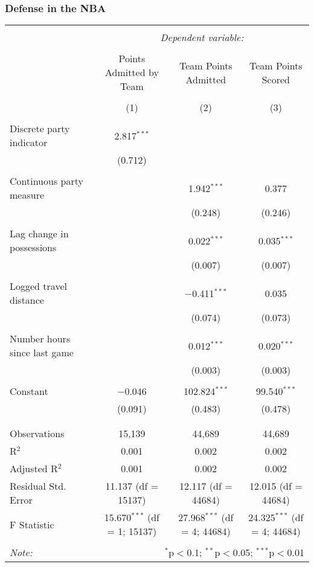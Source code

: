\documentclass{beamer}
\begin{document}
\begin{frame}   \frametitle{Defense in the NBA}
  \begin{adjustwidth}{-.75cm}{}
  \tiny{  %
\begin{tabular}{@{\extracolsep{5pt}}lccc}  \\[-1.8ex]\hline  \hline \\[-1.8ex]   & \multicolumn{3}{c}{\textit{Dependent variable:}} \\  \cline{2-4}  \\[-1.8ex] & Points Admitted by Team & Team Points Admitted & Team Points Scored \\  \\[-1.8ex] & (1) & (2) & (3)\\  \hline \\[-1.8ex]   Discrete party indicator & 2.817$^{***}$ &  &  \\    & (0.712) &  &  \\    & & & \\   Continuous party measure &  & 1.942$^{***}$ & 0.377 \\    &  & (0.248) & (0.246) \\    & & & \\   Lag change in possessions &  & 0.022$^{***}$ & 0.035$^{***}$ \\    &  & (0.007) & (0.007) \\    & & & \\   Logged travel distance &  & $-$0.411$^{***}$ & 0.035 \\    &  & (0.074) & (0.073) \\    & & & \\   Number hours since last game &  & 0.012$^{***}$ & 0.020$^{***}$ \\    &  & (0.003) & (0.003) \\    & & & \\   Constant & $-$0.046 & 102.824$^{***}$ & 99.540$^{***}$ \\    & (0.091) & (0.483) & (0.478) \\    & & & \\  \hline \\[-1.8ex]  Observations & 15,139 & 44,689 & 44,689 \\  R$^{2}$ & 0.001 & 0.002 & 0.002 \\  Adjusted R$^{2}$ & 0.001 & 0.002 & 0.002 \\  Residual Std. Error & 11.137 (df = 15137) & 12.117 (df = 44684) & 12.015 (df = 44684) \\  F Statistic & 15.670$^{***}$ (df = 1; 15137) & 27.968$^{***}$ (df = 4; 44684) & 24.325$^{***}$ (df = 4; 44684) \\  \hline  \hline \\[-1.8ex]  \textit{Note:}  & \multicolumn{3}{r}{$^{*}$p$<$0.1; $^{**}$p$<$0.05; $^{***}$p$<$0.01} \\  \end{tabular}      }
\end{adjustwidth} 
\end{frame}
\end{document}
